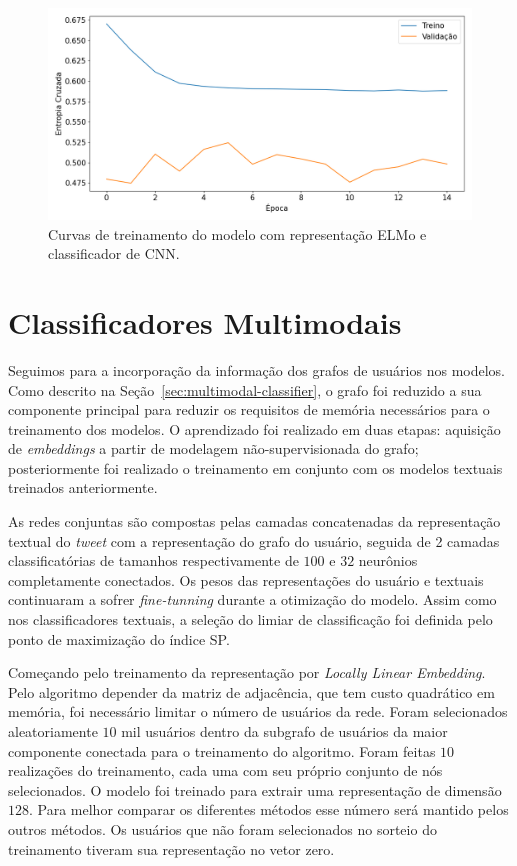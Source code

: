 \begin{figure}[h!]
\begin{center} {
    \begin{center}
    \includegraphics[scale=0.45]{images/elmo_cnn_train.png}
    \caption{Curvas de treinamento do modelo com representação ELMo e classificador de CNN.}
    \label{fig:elmo_train}
    \end{center}
}
\end{center}
\end{figure}

\section{Classificadores Multimodais}

Seguimos para a incorporação da informação dos grafos de usuários nos modelos.
Como descrito na Seção~\ref{sec:multimodal-classifier}, o grafo foi reduzido a
sua componente principal para reduzir os requisitos de memória necessários para
o treinamento dos modelos.
O aprendizado foi realizado em duas etapas: aquisição de \textit{embeddings} a
partir de modelagem não-supervisionada do grafo; posteriormente foi realizado o
treinamento em conjunto com os modelos textuais treinados anteriormente.

As redes conjuntas são compostas pelas camadas concatenadas da representação textual
do \textit{tweet} com a representação do grafo do usuário, seguida de 2 camadas
classificatórias de tamanhos respectivamente de $100$ e $32$ neurônios completamente
conectados.
Os pesos das representações do usuário e textuais continuaram a sofrer
\textit{fine-tunning} durante a otimização do modelo.
Assim como nos classificadores textuais, a seleção do limiar de
classificação foi definida pelo ponto de maximização do índice SP.

Começando pelo treinamento da representação por \textit{Locally Linear Embedding}.
Pelo algoritmo depender da matriz de adjacência, que tem custo quadrático em
memória, foi necessário limitar o número de usuários da rede.
Foram selecionados aleatoriamente $10$ mil usuários dentro da subgrafo de
usuários da maior componente conectada para o treinamento do algoritmo.
Foram feitas $10$ realizações do treinamento, cada uma com seu próprio conjunto
de nós selecionados.
O modelo foi treinado para extrair uma representação de dimensão $128$.
Para melhor comparar os diferentes métodos esse número será mantido pelos outros
métodos.
Os usuários que não foram selecionados no sorteio do treinamento tiveram sua
representação no vetor zero.

